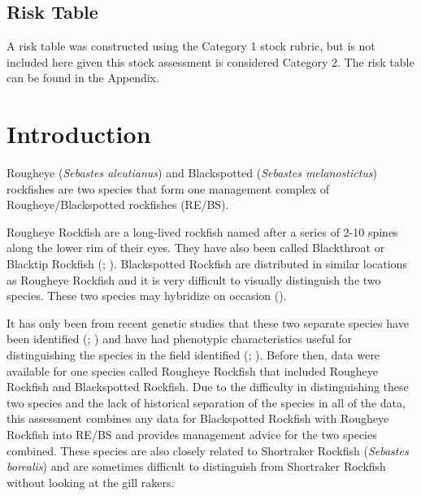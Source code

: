 \documentclass[
  english,
]{article}
\begin{document}
\subsection*{Risk Table}\label{risk-table}

A risk table was constructed using the Category 1 stock rubric, but is
not included here given this stock assessment is considered Category 2.
The risk table can be found in the Appendix.

\newpage{}

\setlength{\parskip}{5mm plus1mm minus1mm}
\setcounter{page}{1}
\setcounter{section}{0}
\renewcommand{\thefigure}{\arabic{figure}}
\setcounter{figure}{0}
\renewcommand{\thetable}{\arabic{table}}
\setcounter{table}{0}

\section{Introduction}\label{introduction}

Rougheye (\emph{Sebastes aleutianus}) and Blackspotted (\emph{Sebastes
melanostictus}) rockfishes are two species that form one management
complex of Rougheye/Blackspotted rockfishes (RE/BS).

Rougheye Rockfish are a long-lived rockfish named after a series of 2-10
spines along the lower rim of their eyes. They have also been called
Blackthroat or Blacktip Rockfish
(;
). Blackspotted Rockfish
are distributed in similar locations as Rougheye Rockfish and it is very
difficult to visually distinguish the two species. These two species may
hybridize on occasion ().

It has only been from recent genetic studies that these two separate
species have been identified
(;
) and have
had phenotypic characteristics useful for distinguishing the species in
the field identified (; ).
Before then, data were available for one species called Rougheye
Rockfish that included Rougheye Rockfish and Blackspotted Rockfish. Due
to the difficulty in distinguishing these two species and the lack of
historical separation of the species in all of the data, this assessment
combines any data for Blackspotted Rockfish with Rougheye Rockfish into
RE/BS and provides management advice for the two species combined. These
species are also closely related to Shortraker Rockfish (\emph{Sebastes
borealis}) and are sometimes difficult to distinguish from Shortraker
Rockfish without looking at the gill rakers.
\end{document}
